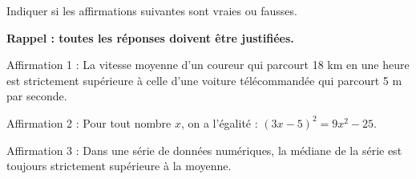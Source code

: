 
\medskip
 
Indiquer si les affirmations suivantes sont vraies ou fausses. 

\textbf{Rappel : toutes les réponses doivent être justifiées.}

\medskip
 
Affirmation 1 : \og La vitesse moyenne d'un coureur qui parcourt 18 km en une heure est strictement supérieure à celle d'une voiture télécommandée qui parcourt 5 m par seconde. \fg
 
Affirmation 2 : \og Pour tout nombre $x$, on a l'égalité : $(3x - 5)^2 = 9x^2 - 25$. \fg
 
Affirmation 3 : \og Dans une série de données numériques, la médiane de la série est toujours strictement supérieure à la moyenne. \fg 

\bigskip  

